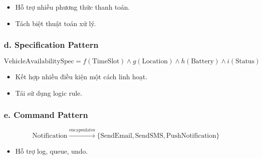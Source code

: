 \begin{itemize}
    \item Hỗ trợ nhiều phương thức thanh toán.
    \item Tách biệt thuật toán xử lý.
\end{itemize}

\subsubsection*{d. Specification Pattern}

\begin{equation*}
\text{VehicleAvailabilitySpec} = 
f(\text{TimeSlot}) \land g(\text{Location}) \land h(\text{Battery}) \land i(\text{Status})
\end{equation*}

\begin{itemize}
    \item Kết hợp nhiều điều kiện một cách linh hoạt.
    \item Tái sử dụng logic rule.
\end{itemize}

\subsubsection*{e. Command Pattern}

\begin{equation*}
\text{Notification} \xrightarrow{\text{encapsulates}}
\{\text{SendEmail}, \text{SendSMS}, \text{PushNotification}\}
\end{equation*}

\begin{itemize}
    \item Hỗ trợ log, queue, undo.
\end{itemize}


